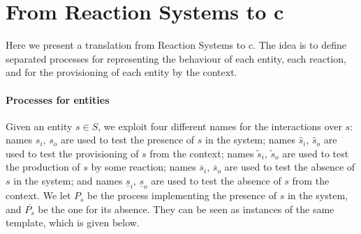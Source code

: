 

\section{From Reaction Systems to c\CNA}
\label{sec:trans}
Here we present a translation from Reaction Systems to c\CNA.
The idea is to define separated processes for representing the behaviour of each entity, each reaction, 
and for the provisioning of each entity by the context.

\paragraph{Processes for entities}
Given an entity $s \in S$, we exploit four different names for the interactions over $s$:
names $s_i$, $s_o$ are used to test the presence of $s$ in the system; names $\widehat{s}_i$, $\widehat{s}_o$ are used to test the provisioning of $s$ from the context;
names $\widetilde{s}_i$, $\widetilde{s}_o$  are used to test the production of $s$ by some reaction; names $\overline{s}_i$, $\overline{s}_o$ are used to test the absence of $s$ in the system; and names $\underline{s}_i$, $\underline{s}_o$ are used to test the absence of $s$ from the context.
We let $P_s$ be the process implementing the  presence of $s$ in the system, and $\overline{P_s}$ be the one for its absence.
They can be seen as instances of the same template, which is given below. 

